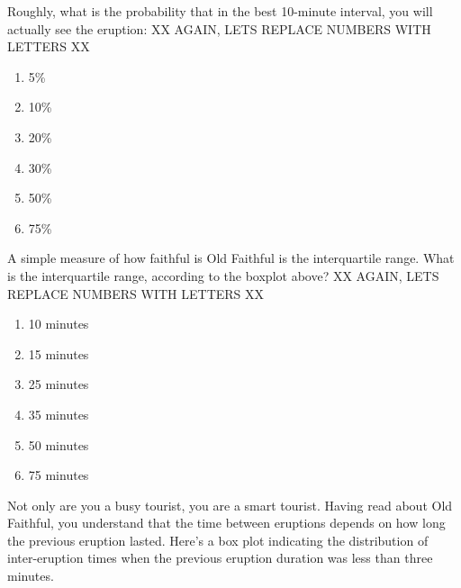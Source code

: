 \noindent


Roughly, what is the probability that in the best 10-minute interval,
you will actually see the eruption:
XX AGAIN, LETS REPLACE NUMBERS WITH LETTERS XX


\begin{enumerate}[leftmargin=1cm, itemsep=0em]


\item 5\%


\item 10\%


\item 20\%


\item 30\%


\item 50\%


\item 75\%


\end{enumerate}





\noindent


A simple measure of how faithful is Old Faithful is the interquartile
range. What is the interquartile range, according to the
boxplot above?
XX AGAIN, LETS REPLACE NUMBERS WITH LETTERS XX


\begin{enumerate}[leftmargin=1cm, itemsep=0em]


\item 10 minutes


\item 15 minutes


\item 25 minutes


\item 35 minutes


\item 50 minutes


\item 75 minutes


\end{enumerate}





Not only are you a busy tourist, you are a smart tourist. Having read
about Old Faithful, you understand that the time between eruptions
depends on how long the previous eruption lasted. Here's a box
plot indicating the distribution of inter-eruption times when the
previous eruption duration was less than three minutes. 





